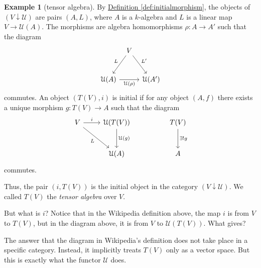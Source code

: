 \documentclass[a4paper]{report}
\theoremstyle{definition}
\newtheorem{example}{Example}[section]
\theoremstyle{plain}
\theoremstyle{remark}
\begin{document}
\begin{example}[tensor algebra]
  By \hyperref[def:initialmorphism]{Definition \ref*{def:initialmorphism}}, the objects of $(V \downarrow \mathcal{U})$ are pairs $(A, L)$, where $A$ is a $k$-algebra and $L$ is a linear map $V \to \mathcal{U}(A)$. The morphisms are algebra homomorphisms $\rho\colon A \to A'$ such that the diagram
  \begin{equation*}
    \begin{tikzcd}[column sep=tiny, row sep=6ex]
      & V \arrow[dl, swap, "L"] \arrow[dr, "L'"] & \\
      \mathcal{U}(A) \arrow[rr, swap, "\mathcal{U}(\rho)"] & & \mathcal{U}(A')
    \end{tikzcd}
  \end{equation*}
  commutes. An object $(T(V), i)$ is initial if for any object $(A, f)$ there exists a unique morphism $g\colon T(V) \to A$ such that the diagram
  \begin{equation*}
    \begin{tikzcd}[row sep=large]
      V \arrow[r, "i"] \arrow[dr, swap, "L"] & \mathcal{U}(T(V)) \arrow[d, "\mathcal{U}(g)"] & & T(V) \arrow[d, "\exists!g"] \\
      & \mathcal{U}(A) & & A
    \end{tikzcd}
  \end{equation*}
  commutes.

  Thus, the pair $(i, T(V))$ is the initial object in the category $(V \downarrow \mathcal{U})$. We called $T(V)$ the \emph{tensor algebra} over $V$. 

  But what is $i$? Notice that in the Wikipedia definition above, the map $i$ is from $V$ to $T(V)$, but in the diagram above, it is from $V$ to $\mathcal{U}(T(V))$. What gives?

  The answer that the diagram in Wikipedia's definition does not take place in a specific category. Instead, it implicitly treats $T(V)$ only as a vector space. But this is exactly what the functor $\mathcal{U}$ does.
\end{example}
\end{document}
